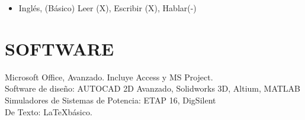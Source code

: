 \documentclass[margin]{res}
\begin{document}
\begin{resume}
\begin{itemize}
  \item Inglés,  (Básico) \hfill Leer (X), Escribir (X), Hablar(-)

\end{itemize}

\section{SOFTWARE}
Microsoft Office, Avanzado. Incluye Access y MS Project.\\
Software de diseño: AUTOCAD 2D Avanzado, Solidworks 3D, Altium, MATLAB\\
Simuladores de Sistemas de Potencia: ETAP 16, DigSilent\\
De Texto: \LaTeX básico.







\end{resume}
\end{document}
